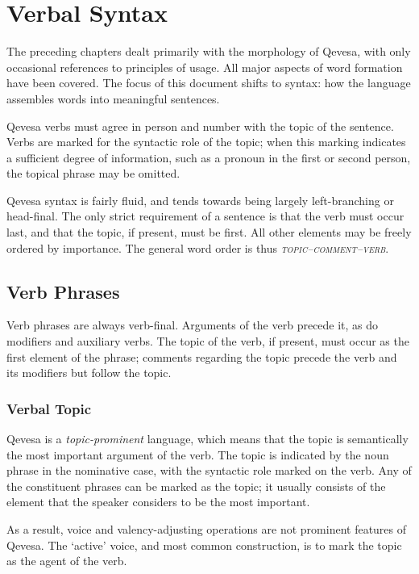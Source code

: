 \documentclass[grammar]{subfiles}
\begin{document}
	\chapter{Verbal Syntax}
	\label{ch:verbal-syntax}

	The preceding chapters dealt primarily with the morphology of Qevesa, with only occasional references to principles of usage. All major aspects of word formation have been covered. The focus of this document shifts to syntax: how the language assembles words into meaningful sentences.

	Qevesa verbs must agree in person and number with the topic of the sentence. Verbs are marked for the syntactic role of the topic; when this marking indicates a sufficient degree of information, such as a pronoun in the first or second person, the topical phrase may be omitted.

	Qevesa syntax is fairly fluid, and tends towards being largely left-branching or head-final. The only strict requirement of a sentence is that the verb must occur last, and that the topic, if present, must be first. All other elements may be freely ordered by importance. The general word order is thus \emph{\textsc{topic–comment–verb}}.

	\section{Verb Phrases}
	\label{sec:syn_verb_phrases}

	Verb phrases are always verb-final. Arguments of the verb precede it, as do modifiers and auxiliary verbs. The topic of the verb, if present, must occur as the first element of the phrase; comments regarding the topic precede the verb and its modifiers but follow the topic.

	\subsection{Verbal Topic}
	\label{ssec:syn_verbal_topic}

	Qevesa is a \emph{topic-prominent} language, which means that the topic is semantically the most important argument of the verb. The topic is indicated by the noun phrase in the nominative case, with the syntactic role marked on the verb. Any of the constituent phrases can be marked as the topic; it usually consists of the element that the speaker considers to be the most important.

	As a result, voice and valency-adjusting operations are not prominent features of Qevesa. The ‘active’ voice, and most common construction, is to mark the topic as the agent of the verb.
\end{document}
